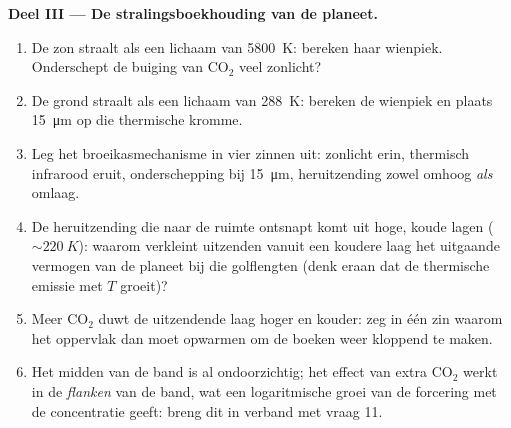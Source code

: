 \begin{problem}
\medskip\noindent\textbf{Deel III --- De stralingsboekhouding van de planeet.}
\begin{enumerate}[resume]
  \item De zon straalt als een lichaam van \qty{5800}{K}: bereken haar
        wienpiek. Onderschept de buiging van CO$_2$ veel zonlicht?
  \item De grond straalt als een lichaam van \qty{288}{K}: bereken de
        wienpiek en plaats \qty{15}{\micro m} op die thermische kromme.
  \item Leg het broeikasmechanisme in vier zinnen uit: zonlicht erin,
        thermisch infrarood eruit, onderschepping bij \qty{15}{\micro m},
        heruitzending zowel omhoog \emph{als} omlaag.
  \item De heruitzending die naar de ruimte ontsnapt komt uit hoge, koude
        lagen ($\sim\qty{220}{K}$): waarom verkleint uitzenden vanuit een
        koudere laag het uitgaande vermogen van de planeet bij die
        golflengten (denk eraan dat de thermische emissie met $T$ groeit)?
  \item Meer CO$_2$ duwt de uitzendende laag hoger en kouder: zeg in één
        zin waarom het oppervlak dan moet opwarmen om de boeken weer
        kloppend te maken.
  \item Het midden van de band is al ondoorzichtig; het effect van extra
        CO$_2$ werkt in de \emph{flanken} van de band, wat een
        logaritmische groei van de forcering met de concentratie geeft:
        breng dit in verband met vraag 11.
\end{enumerate}


\end{problem}
